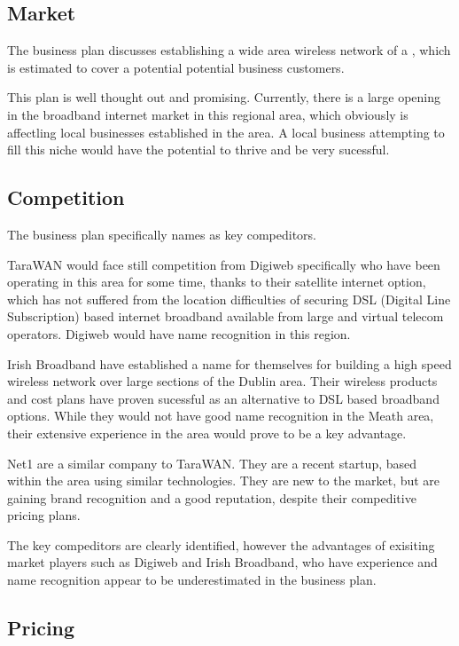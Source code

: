 \documentclass[a4paper,12pt]{article}
\begin{document}
\subsection{Market}

The business plan discusses establishing a wide area wireless network of
a \cite[20 km radius]{busplan}, which is estimated to cover a potential
\cite[8000]{busplan} potential business customers.


This plan is well thought out and promising. Currently, there is a large
opening in the broadband internet market in this regional area, which
obviously is affectling local businesses established in the area. A
local business attempting to fill this niche would have the potential to
thrive and be very sucessful.

\subsection{Competition}

The business plan specifically names 
\cite[DigiWeb, Irish Broadband and Net1]{busplan} as key compeditors.


TaraWAN would face still competition from Digiweb specifically who have
been operating in this area for some time, thanks to their satellite
internet option, which has not suffered from the location difficulties
of securing DSL (Digital Line Subscription) based internet broadband
available from large and virtual telecom operators. Digiweb would have
name recognition in this region.


Irish Broadband have established a name for themselves for building a
high speed wireless network over large sections of the Dublin area.
Their wireless products and cost plans have proven sucessful as an
alternative to DSL based broadband options. While they would not have
good name recognition in the Meath area, their extensive experience in 
the area would prove to be a key advantage.


Net1 are a similar company to TaraWAN. They are a recent startup, based
within the area using similar technologies. They are new to the market,
but are gaining brand recognition and a good reputation, despite their
compeditive pricing plans.


The key compeditors are clearly identified, however the advantages of
exisiting market players such as Digiweb and Irish Broadband, who have
experience and name recognition appear to be underestimated in the
business plan. 

\subsection{Pricing}
\end{document}
